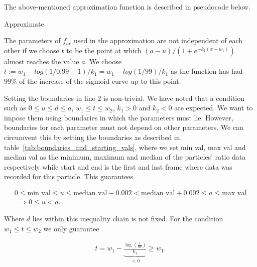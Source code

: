 The above-mentioned approximation function is described in pseudocode below.

\begin{algorithm}[H] \label{alg:approximate}
	\SetAlgoLined
	\DontPrintSemicolon
	\LinesNumbered
	\caption{Approximate}
	
	
	\BlankLine
\end{algorithm}
\vspace{1cm}

The parameters of $f_{ac}$ used in the approximation are not independent of each other if we choose $t$ to be the point at which $(a-u)/(1+e^{-k_1(x-w_1)})$ almost reaches the value $a$. We choose $t := w_1 - log(1/0.99-1) / k_1 = w_1 - log(1/99) / k_1$ as the function has had $99\%$ of the increase of the sigmoid curve up to this point.

Setting the boundaries in line 2 is non-trivial. We have noted that a condition such as $0 \leq u \leq d \leq a$, $w_1 \leq t \leq w_2$, $k_1 > 0$ and $k_2 < 0$ are expected. We want to impose them using boundaries in which the parameters must lie. However, boundaries for each parameter must not depend on other parameters. We can circumvent this by setting the boundaries as described in table~\ref{tab:boundaries_and_starting_vals}, where we set min val, max val and median val as the minimum, maximum and median of the particles' ratio data respectively while start and end is the first and last frame where data was recorded for this particle. This guarantees

\begin{align*}
	0 \leq \text{min val} \leq u \leq \text{median val} - 0.002 < \text{median val} + 0.002 \leq a \leq \text{max val}\\
	\implies 0 \leq u < a.
\end{align*}

Where $d$ lies within this inequality chain is not fixed. For the condition $w_1 \leq t \leq w_2$ we only guarantee

\begin{align*}
	t = w_1 - \underbrace{\frac{\log(\frac{1}{99})}{k_1}}_{< 0} \geq w_1.
\end{align*}

